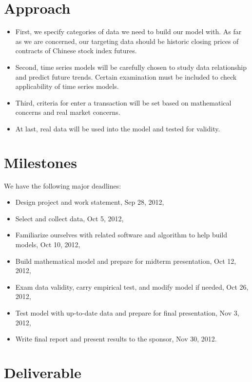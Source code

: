 \documentclass[12pt,letterpaper]{article}
\theoremstyle{definition}
\begin{document}
\section{Approach}
\begin{itemize}
    \item 	First, we specify categories of data we need to build our model with. As far as we are concerned, our targeting data should be historic closing prices of contracts of Chinese stock index futures.  
    \item 	Second, time series models will be carefully chosen to study data relationship and predict future trends. Certain examination must be included to check applicability of time series models.
    \item 	Third, criteria for enter a transaction will be set based on mathematical concerns and real market concerns.
    \item   At last, real data will be used into the model and tested for validity.
    
\end{itemize}
\section{Milestones}
We have the following major deadlines:
\begin{itemize}
    \item Design project and work statement, Sep 28, 2012,
    \item Select and collect data, Oct 5, 2012,
    \item Familiarize ourselves with related software and algorithm to help build models, Oct 10, 2012,
    \item Build mathematical model and prepare for midterm presentation, Oct 12, 2012,
    \item Exam data validity, carry empirical test, and modify model if needed, Oct 26, 2012,
    \item Test model with up-to-date data and prepare for final presentation, Nov 3, 2012,
    \item Write final report and present results to the sponsor, Nov 30, 2012.
\end{itemize}

\section{Deliverable}
\end{document}
